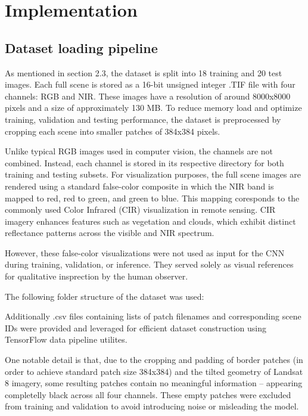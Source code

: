 {

\setlength{\parindent}{0pt}
\setlength{\parskip}{1em}

\section{Implementation}
\subsection{Dataset loading pipeline}

As mentioned in section 2.3, the dataset is split into 18 training and 20 test images. Each full scene is stored as a 16-bit unsigned integer .TIF file with four channels: RGB and NIR.  These images have a resolution of around 8000x8000 pixels and a size of approximately 130 MB. To reduce memory load and optimize training, validation and testing performance, the dataset is preprocessed by cropping each scene into smaller patches of 384x384 pixels.

Unlike typical RGB images used in computer vision, the channels are not combined. Instead, each channel is stored in its respective directory for both training and testing subsets. For visualization purposes, the full scene images are rendered using a standard false-color composite in which the NIR band is mapped to red, red to green, and green to blue. This mapping coresponds to the commonly used Color Infrared (CIR) visualization in remote sensing. CIR imagery enhances features such as vegetation and clouds, which exhibit distinct reflectance patterns across the visible and NIR spectrum.

However, these false-color visualizations were not used as input for the CNN during training, validation, or inference. They served solely as visual references for qualitative insprection by the human observer.


The following folder structure of the dataset was used:


Additionally .csv files containing lists of patch filenames and corresponding scene IDs were provided and leveraged for efficient dataset construction using TensorFlow data pipeline utilites.

One notable detail is that, due to the cropping and padding of border patches (in order to achieve standard patch size 384x384) and the tilted geometry of Landsat 8 imagery, some resulting patches contain no meaningful information – appearing completelly black across all four channels. These empty patches were excluded from training and validation to avoid introducing noise or misleading the model.

}
